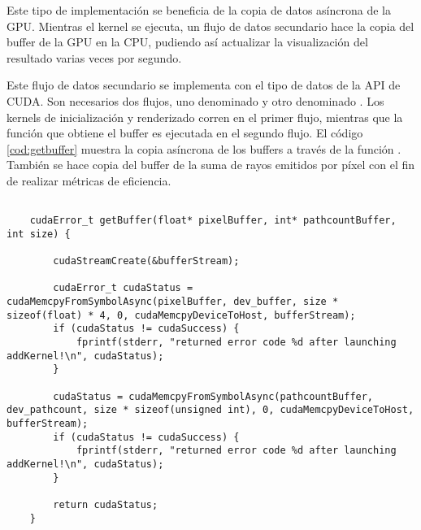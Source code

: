 Este tipo de implementación se beneficia de la copia de datos asíncrona de la GPU. Mientras el kernel se ejecuta, un flujo de datos secundario hace la copia del buffer de la GPU en la CPU, pudiendo así actualizar la visualización del resultado varias veces por segundo.

Este flujo de datos secundario se implementa con el tipo de datos  de la API de CUDA. Son necesarios dos flujos, uno denominado  y otro denominado . Los kernels de inicialización y renderizado corren en el primer flujo, mientras que la función que obtiene el buffer es ejecutada en el segundo flujo. El código \autoref{cod:getbuffer} muestra la copia asíncrona de los buffers a través de la función . También se hace copia del buffer de la suma de rayos emitidos por píxel  con el fin de realizar métricas de eficiencia.


\begin{minipage}[c]{0.95\textwidth}
\begin{lstlisting}[label={cod:getbuffer}, caption={Código para obtener los buffers de la GPU}]
	
	cudaError_t getBuffer(float* pixelBuffer, int* pathcountBuffer, int size) {

		cudaStreamCreate(&bufferStream);

		cudaError_t cudaStatus = cudaMemcpyFromSymbolAsync(pixelBuffer, dev_buffer, size * sizeof(float) * 4, 0, cudaMemcpyDeviceToHost, bufferStream);
		if (cudaStatus != cudaSuccess) {
			fprintf(stderr, "returned error code %d after launching addKernel!\n", cudaStatus);
		}

		cudaStatus = cudaMemcpyFromSymbolAsync(pathcountBuffer, dev_pathcount, size * sizeof(unsigned int), 0, cudaMemcpyDeviceToHost, bufferStream);
		if (cudaStatus != cudaSuccess) {
			fprintf(stderr, "returned error code %d after launching addKernel!\n", cudaStatus);
		}

		return cudaStatus;
	}
	
\end{lstlisting}
\end{minipage}

